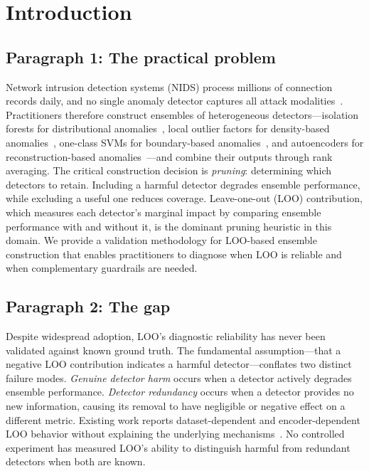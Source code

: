 \section{Introduction}
\label{sec:introduction}

\subsection*{Paragraph 1: The practical problem}

Network intrusion detection systems (NIDS) process millions of connection records daily, and no single anomaly detector captures all attack modalities~\cite{ahmed2016survey}. Practitioners therefore construct ensembles of heterogeneous detectors---isolation forests for distributional anomalies~\cite{liu2012isolation}, local outlier factors for density-based anomalies~\cite{breunig2000lof}, one-class SVMs for boundary-based anomalies~\cite{scholkopf2001estimating}, and autoencoders for reconstruction-based anomalies~\cite{kingma2014autoencoding}---and combine their outputs through rank averaging. The critical construction decision is \emph{pruning}: determining which detectors to retain. Including a harmful detector degrades ensemble performance, while excluding a useful one reduces coverage. Leave-one-out (LOO) contribution, which measures each detector's marginal impact by comparing ensemble performance with and without it, is the dominant pruning heuristic in this domain. We provide a validation methodology for LOO-based ensemble construction that enables practitioners to diagnose when LOO is reliable and when complementary guardrails are needed.

\subsection*{Paragraph 2: The gap}

Despite widespread adoption, LOO's diagnostic reliability has never been validated against known ground truth. The fundamental assumption---that a negative LOO contribution indicates a harmful detector---conflates two distinct failure modes. \emph{Genuine detector harm} occurs when a detector actively degrades ensemble performance. \emph{Detector redundancy} occurs when a detector provides no new information, causing its removal to have negligible or negative effect on a different metric. Existing work reports dataset-dependent and encoder-dependent LOO behavior without explaining the underlying mechanisms~\cite{pang2021deep}. No controlled experiment has measured LOO's ability to distinguish harmful from redundant detectors when both are known.

